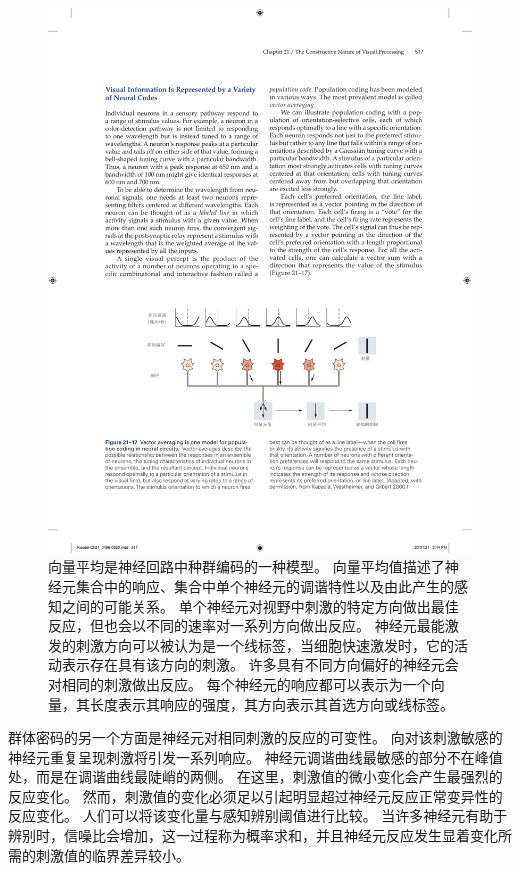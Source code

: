 \begin{figure}[htbp]
	\centering
	\includegraphics[width=1.0\linewidth]{chap21/fig_21_17}
	\caption{向量平均是神经回路中种群编码的一种模型。
		向量平均值描述了神经元集合中的响应、集合中单个神经元的调谐特性以及由此产生的感知之间的可能关系。
		单个神经元对视野中刺激的特定方向做出最佳反应，但也会以不同的速率对一系列方向做出反应。
		神经元最能激发的刺激方向可以被认为是一个线标签，当细胞快速激发时，它的活动表示存在具有该方向的刺激。
		许多具有不同方向偏好的神经元会对相同的刺激做出反应。
		每个神经元的响应都可以表示为一个向量，其长度表示其响应的强度，其方向表示其首选方向或线标签\cite{kapadia2000spatial}。}
	\label{fig:21_17}
\end{figure}


群体密码的另一个方面是神经元对相同刺激的反应的可变性。
向对该刺激敏感的神经元重复呈现刺激将引发一系列响应。
神经元调谐曲线最敏感的部分不在峰值处，而是在调谐曲线最陡峭的两侧。
在这里，刺激值的微小变化会产生最强烈的反应变化。
然而，刺激值的变化必须足以引起明显超过神经元反应正常变异性的反应变化。
人们可以将该变化量与感知辨别阈值进行比较。
当许多神经元有助于辨别时，信噪比会增加，这一过程称为概率求和，并且神经元反应发生显着变化所需的刺激值的临界差异较小。


